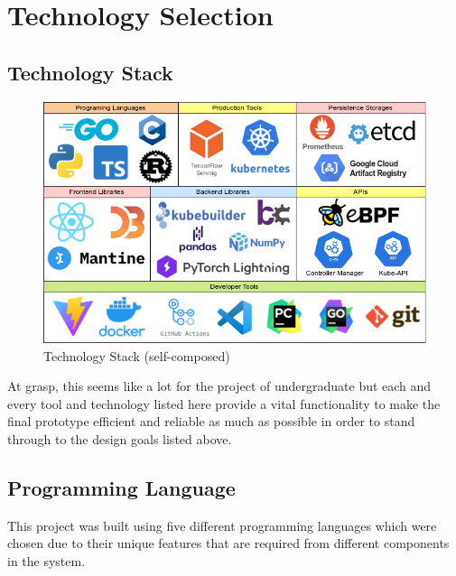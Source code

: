 \section{Technology Selection}
\subsection{Technology Stack}

\begin{figure}[H] 
    \includegraphics[width=16cm]{assets/implementation/technology-stack.png}
    \caption{Technology Stack (self-composed)}
    \label{fig:technology-stack}
\end{figure}

At grasp, this seems like a lot for the project of undergraduate but each and every tool and technology listed here provide a vital functionality to make the final prototype efficient and reliable as much as possible in order to stand through to the design goals listed above.

\subsection{Programming Language}

This project was built using five different programming languages which were chosen due to their unique features that are required from different components in the system.


